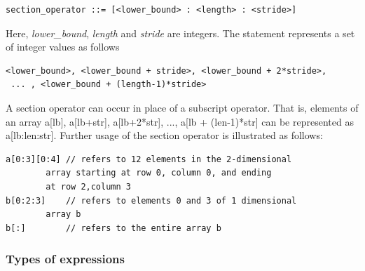 \documentclass[]{scrartcl}
\begin{document}
\begin{lstlisting}
section_operator ::= [<lower_bound> : <length> : <stride>]
\end{lstlisting}

Here, \textit{lower\_bound}, \textit{length} and \textit{stride} are integers. The statement
represents a set of integer values as follows

\begin{verbatim}
<lower_bound>, <lower_bound + stride>, <lower_bound + 2*stride>,
 ... , <lower_bound + (length-1)*stride>
\end{verbatim}

A section operator can occur in place of a subscript operator. That is, elements of an array
a[lb], a[lb+str], a[lb+2*str], ..., a[lb + (len-1)*str] can be represented as a[lb:len:str].
Further usage of the section operator is illustrated as follows:

\begin{lstlisting}
a[0:3][0:4]	// refers to 12 elements in the 2-dimensional
		array starting at row 0, column 0, and ending
		at row 2,column 3
b[0:2:3] 	// refers to elements 0 and 3 of 1 dimensional
		array b
b[:] 		// refers to the entire array b
\end{lstlisting}

\subsubsection{Types of expressions}
\end{document}
